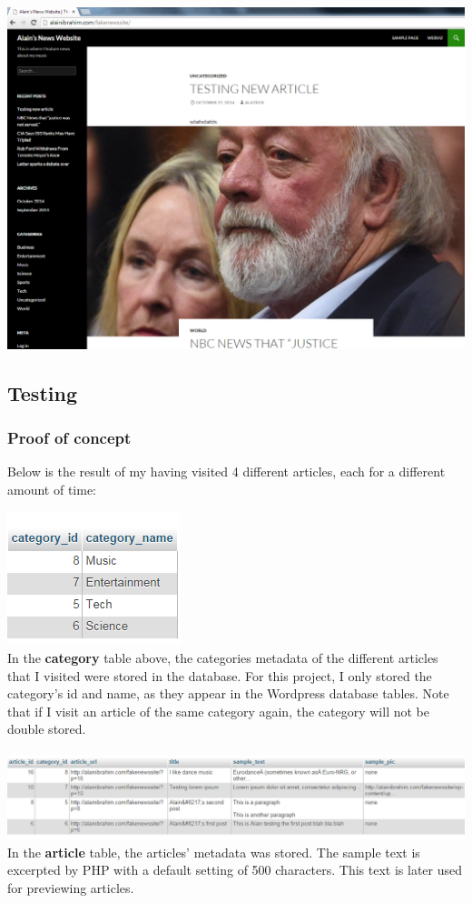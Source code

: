 \documentclass[12pt]{article}
\begin{document}
\noindent\includegraphics[scale=0.4]{img/fakenewssite_main} 

\newpage

\subsection{Testing}
\subsubsection{Proof of concept}
Below is the result of my having visited 4 different articles, each for a different amount of time:

\noindent\includegraphics[scale=1]{img/results_categories} \\
\noindent In the \textbf{category} table above, the categories metadata of the different articles that I visited were stored in the database. For this project, I only stored the category's id and name, as they appear in the Wordpress database tables. Note that if I visit an article of the same category again, the category will not be double stored. \\ \\

\noindent\includegraphics[scale=0.6]{img/results_articles}
\noindent In the \textbf{article} table, the articles' metadata was stored. The sample text is excerpted by PHP with a default setting of 500 characters. This text is later used for previewing articles. \\ \\ 
\end{document}
